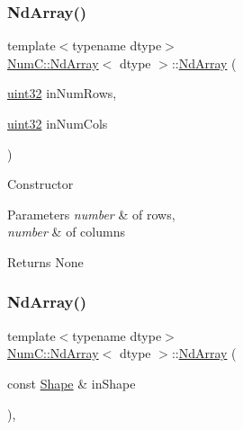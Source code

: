 \subsubsection{\texorpdfstring{Nd\+Array()}{NdArray()}\hspace{0.1cm}{\footnotesize\ttfamily [3/12]}}
{\footnotesize\ttfamily template$<$typename dtype$>$ \\
\mbox{\hyperlink{class_num_c_1_1_nd_array}{Num\+C\+::\+Nd\+Array}}$<$ dtype $>$\+::\mbox{\hyperlink{class_num_c_1_1_nd_array}{Nd\+Array}} (\begin{DoxyParamCaption}\item[{\mbox{\hyperlink{namespace_num_c_ae685802ca6d3035f2b400b081e3953fa}{uint32}}}]{in\+Num\+Rows,  }\item[{\mbox{\hyperlink{namespace_num_c_ae685802ca6d3035f2b400b081e3953fa}{uint32}}}]{in\+Num\+Cols }\end{DoxyParamCaption})\hspace{0.3cm}{\ttfamily [inline]}}

Constructor


\begin{DoxyParams}{Parameters}
{\em number} & of rows, \\
\hline
{\em number} & of columns \\
\hline
\end{DoxyParams}
\begin{DoxyReturn}{Returns}
None 
\end{DoxyReturn}
\mbox{\label{class_num_c_1_1_nd_array_abfb0bb5fe5fc12c2c0aa66c0c403278f}} 
\subsubsection{\texorpdfstring{Nd\+Array()}{NdArray()}\hspace{0.1cm}{\footnotesize\ttfamily [4/12]}}
{\footnotesize\ttfamily template$<$typename dtype$>$ \\
\mbox{\hyperlink{class_num_c_1_1_nd_array}{Num\+C\+::\+Nd\+Array}}$<$ dtype $>$\+::\mbox{\hyperlink{class_num_c_1_1_nd_array}{Nd\+Array}} (\begin{DoxyParamCaption}\item[{const \mbox{\hyperlink{class_num_c_1_1_shape}{Shape}} \&}]{in\+Shape }\end{DoxyParamCaption})\hspace{0.3cm}{\ttfamily [inline]}, {\ttfamily [explicit]}}

